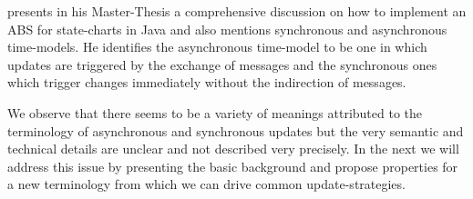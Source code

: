 \cite{yuxuan_agent-based_2016} presents in his Master-Thesis a comprehensive discussion on how to implement an ABS for state-charts in Java and also mentions synchronous and asynchronous time-models. He identifies the asynchronous time-model to be one in which updates are triggered by the exchange of messages and the synchronous ones which trigger changes immediately without the indirection of messages.

\medskip

We observe that there seems to be a variety of meanings attributed to the terminology of asynchronous and synchronous updates but the very semantic and technical details are unclear and not described very precisely. In the next we will address this issue by presenting the basic background and propose properties for a new terminology from which we can drive common update-strategies.